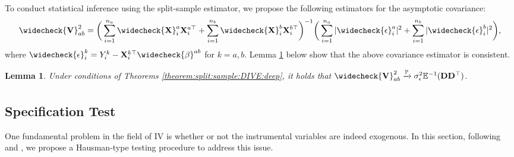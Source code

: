 \documentclass[11pt, preprint]{imsart}
\numberwithin{equation}{section}
\def \bfD{\mathbf{D}}
\def \bfX{\mathbf{X}}
\def \bfV{\mathbf{V}}
\def \bfD{\mathbf{D}}
\def \ev{\mathbb{E}}
\def \cip{\xrightarrow[\text{}]{\text{$\mathbb{P}$}}}
\theoremstyle{plain}
\newtheorem{lemma}{\indent Lemma}
\theoremstyle{definition}
\begin{document}
To conduct statistical inference using the split-sample estimator, we propose the following estimators for the asymptotic covariance:
\begin{eqnarray}
	\widecheck{\bfV}^2_{ab}= \bigg(\sum_{i=1}^{n_a}\widecheck{\bfX}_i^a\bfX_i^{a\top}+\sum_{i=1}^{n_b}\widecheck{\bfX}_i^b\bfX_i^{b\top}\bigg) ^{-1}\bigg(\sum_{i=1}^{n_a}|\widecheck{\epsilon}_i^{a}|^2+\sum_{i=1}^{n_b}|\widecheck{\epsilon}_i^{b}|^2\bigg),\nonumber
\end{eqnarray}
where $\widecheck{\epsilon}_i^{k}=Y_i^k-\bfX_i^{k\top}\widecheck{\beta}^{ab}$  for $k=a,b$. Lemma \ref{lemma:split:sample:estimation:variance} below show that the above covariance estimator is consistent.
\begin{lemma}\label{lemma:split:sample:estimation:variance}
Under conditions of Theorems \ref{theorem:split:sample:DIVE:deep}, it holds that $\widecheck{\bfV}_{ab}^2\cip \sigma_\epsilon^2\ev^{-1}(\bfD\bfD^\top)$.
\end{lemma}

\subsection{Specification Test}

One fundamental problem in the field of IV is whether or not the instrumental variables are indeed exogenous. In this section, following \cite{h78} and \cite{bcch12}, we propose a Hausman-type testing procedure to address this issue. 
\end{document}

